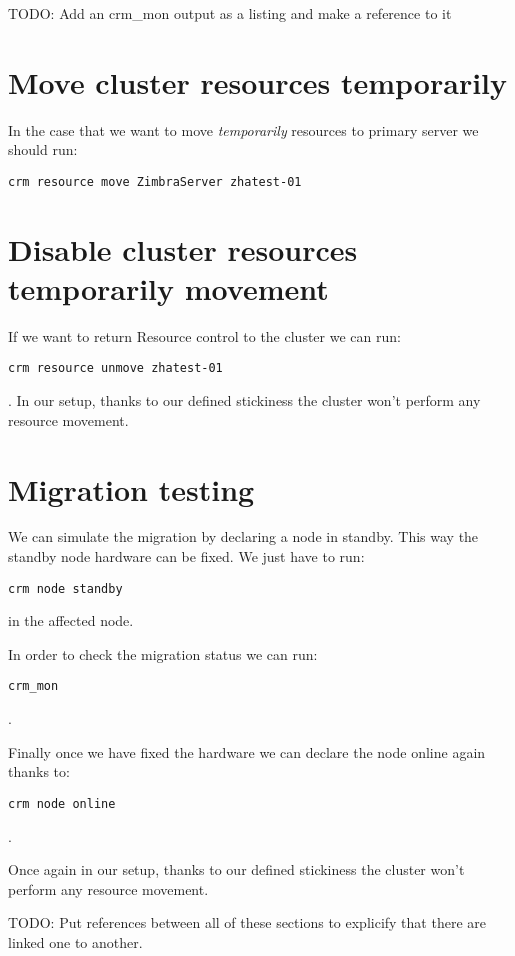 TODO: Add an crm\_mon output as a listing and make a reference to it

\section {Move cluster resources temporarily}
In the case that we want to move \textit{temporarily} resources to primary server we should run:
\begin{verbatim}
crm resource move ZimbraServer zhatest-01
\end{verbatim}

\section {Disable cluster resources temporarily movement}
If we want to return Resource control to the cluster we can run:
\begin{verbatim}
crm resource unmove zhatest-01
\end{verbatim}
. In our setup, thanks to our defined stickiness the cluster won't perform any resource movement.

\section {Migration testing}
We can simulate the migration by declaring a node in standby. This way the standby node hardware can be fixed. We just have to run:
\begin{verbatim}
crm node standby
\end{verbatim}
in the affected node.

In order to check the migration status we can run:
\begin{verbatim}
crm_mon
\end{verbatim}
.

Finally once we have fixed the hardware we can declare the node online again thanks to:
\begin{verbatim}
crm node online
\end{verbatim}
.

Once again in our setup, thanks to our defined stickiness the cluster won't perform any resource movement.


TODO: Put references between all of these sections to explicify that there are linked one to another.

